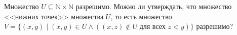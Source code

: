 Множество $U \subseteq \mathbb{N} \times \mathbb{N}$ разрешимо. Можно ли утверждать, что множество <<нижних точек>> множества
$U$, то есть множество $V = \{ (x, y) \mid (x, y) \in U \land ((x, z) \notin U \text{ для всех } z < y )\}$ разрешимо?